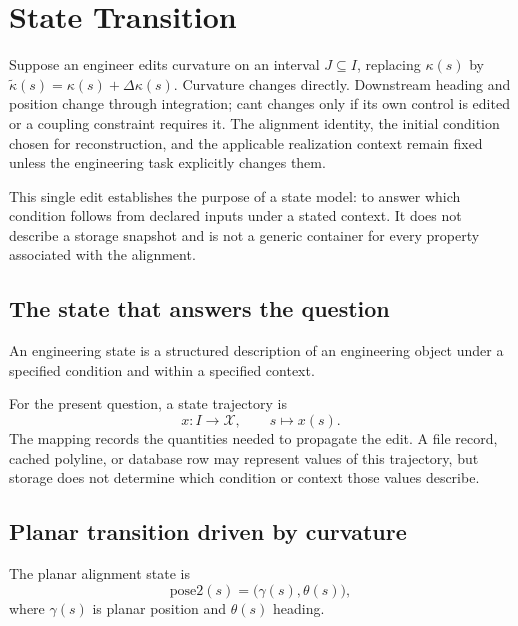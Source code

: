 
\chapter{State Transition}
\label{chap:state-model}

Suppose an engineer edits curvature on an interval
\(J\subseteq I\), replacing \(\kappa(s)\) by
\(\widetilde\kappa(s)=\kappa(s)+\Delta\kappa(s)\). Curvature changes
directly. Downstream heading and position change through integration;
cant changes only if its own control is edited or a coupling constraint
requires it. The alignment identity, the initial condition chosen for
reconstruction, and the applicable realization context remain fixed
unless the engineering task explicitly changes them.

This single edit establishes the purpose of a state model: to answer
which condition follows from declared inputs under a stated context. It
does not describe a storage snapshot and is not a generic container for
every property associated with the alignment.

\section{The state that answers the question}

\begin{definition}
\label{def:state}
An engineering state is a structured description of an engineering
object under a specified condition and within a specified context.
\end{definition}

For the present question, a state trajectory is
\[
x:I\rightarrow\mathcal X,
\qquad s\longmapsto x(s).
\]
The mapping records the quantities needed to propagate the edit. A file
record, cached polyline, or database row may represent values of this
trajectory, but storage does not determine which condition or context
those values describe.

\section{Planar transition driven by curvature}

\begin{definition}[pose2]
\label{def:notation-pose2}
The planar alignment state is
\begin{equation}
\mathrm{pose2}(s)=\bigl(\gamma(s),\theta(s)\bigr),
\label{eq:pose2-definition}
\end{equation}
where \(\gamma(s)\) is planar position and \(\theta(s)\) heading.
\end{definition}

